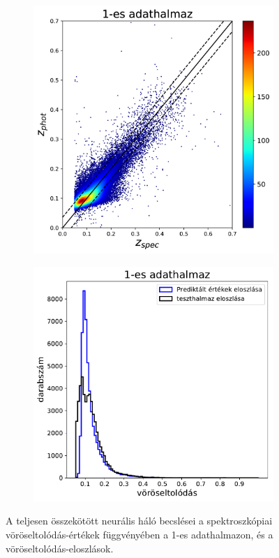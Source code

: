 \documentclass[12pt,letterpaper,oneside,openright]{book}
\begin{document}
\begin{figure}[h!]
  \centering
  \begin{subfigure}[b]{0.3\textwidth}
    \includegraphics[width=\textwidth, height = \textwidth]{Figures/plotDNN1.png}
    \label{fig:1}
  \end{subfigure}
  \hspace{1.7cm}
  \begin{subfigure}[b]{0.3\textwidth}
    \includegraphics[width=\textwidth, height = \textwidth]{Figures/histDNN1.pdf}
    \label{fig:2}
  \end{subfigure}
  \caption{A teljesen összekötött neurális háló becslései a spektroszkópiai vöröseltolódás-értékek függvényében a 1-es adathalmazon, és a vöröseltolódás-eloszlások.}
\label{dnn1}
\end{figure}
\end{document}
